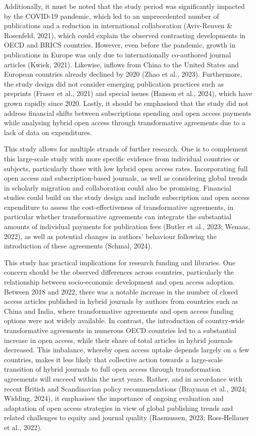 \documentclass[a4paper,man,floatsintext,longtable,noextraspace,12pt]{apa6}
\begin{document}
Additionally, it must be noted that the study period was significantly
impacted by the COVID-19 pandemic, which led to an unprecedented number
of publications and a reduction in international collaboration
(Aviv-Reuven \& Rosenfeld, 2021), which could explain the observed
contrasting developments in OECD and BRICS countries. However, even
before the pandemic, growth in publications in Europe was only due to
internationally co-authored journal articles (Kwiek, 2021). Likewise,
inflows from China to the United States and European countries already
declined by 2020 (Zhao et al., 2023). Furthermore, the study design did
not consider emerging publication practices such as preprints (Fraser et
al., 2021) and special issues (Hanson et al., 2024), which have grown
rapidly since 2020. Lastly, it should be emphasised that the study did
not address financial shifts between subscriptions spending and open
access payments while analysing hybrid open access through
transformative agreements due to a lack of data on expenditures.

This study allows for multiple strands of further research. One is to
complement this large-scale study with more specific evidence from
individual countries or subjects, particularly those with low hybrid
open access rates. Incorporating full open access and subscription-based
journals, as well as considering global trends in scholarly migration
and collaboration could also be promising. Financial studies could build
on the study design and include subscription and open access expenditure
to assess the cost-effectiveness of transformative agreements, in
particular whether transformative agreements can integrate the
substantial amounts of individual payments for publication fees (Butler
et al., 2023; Wenaas, 2022), as well as potential changes in authors'
behaviour following the introduction of these agreements (Schmal, 2024).

This study has practical implications for research funding and
libraries. One concern should be the observed differences across
countries, particularly the relationship between socio-economic
development and open access adoption. Between 2018 and 2022, there was a
notable increase in the number of closed access articles published in
hybrid journals by authors from countries such as China and India, where
transformative agreements and open access funding options were not
widely available. In contrast, the introduction of country-wide
transformative agreements in numerous OECD countries led to a
substantial increase in open access, while their share of total articles
in hybrid journals decreased. This imbalance, whereby open access uptake
depends largely on a few countries, makes it less likely that collective
action towards a large-scale transition of hybrid journals to full open
access through transformation agreements will succeed within the next
years. Rather, and in accordance with recent British and Scandinavian
policy recommendations (Brayman et al., 2024; Widding, 2024), it
emphasises the importance of ongoing evaluation and adaptation of open
access strategies in view of global publishing trends and related
challenges to equity and journal quality (Rasmussen, 2023; Ross-Hellauer
et al., 2022).
\end{document}
